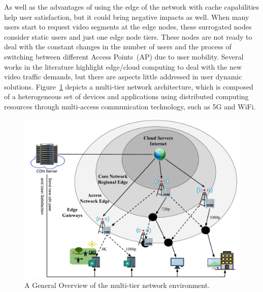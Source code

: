 As well as the advantages of using the edge of the network with cache capabilities help user satisfaction, but it could bring negative impacts as well. When many users start to request video segments at the edge nodes, these surrogated nodes consider static users and just one edge node tiers. These nodes are not ready to deal with the constant changes in the number of users and the process of switching between different Access Points~(AP) due to user mobility.
Several works in the literature highlight edge/cloud computing to deal with the new video traffic demands, but there are aspects little addressed in user dynamic solutions. Figure~\ref{fig:multi-tier-network} depicts a multi-tier network architecture, which is composed of a heterogeneous set of devices and applications using distributed computing resources through multi-access communication technology, such as 5G and WiFi.
%
%


\begin{figure}
    \centering
    \includegraphics[width=\linewidth]{images/arch-video-content.pdf}
    \caption{A General Overview of the multi-tier network environment.}
    \label{fig:multi-tier-network}
\end{figure}

